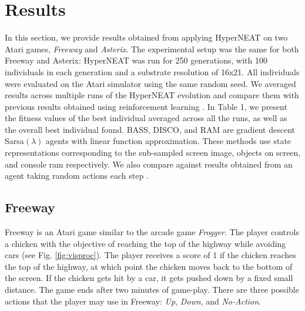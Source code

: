 \documentclass{acm_proc_article-sp}
\begin{document}
\section{Results}
\label{sec:results}
In this section, we provide results obtained from applying HyperNEAT on two Atari games, \textit{Freeway} and \textit{Asterix}. The experimental setup was the same for both Freeway and Asterix: HyperNEAT was run for 250 generations, with 100 individuals in each generation and a substrate resolution of 16x21. All individuals were evaluated on the Atari simulator using the same random seed. We averaged results across multiple runs of the HyperNEAT evolution and compare them with previous results obtained using reinforcement learning \cite{naddaf10}. In Table 1, we present the fitness values of the best individual averaged across all the runs, as well as the overall best individual found. BASS, DISCO, and RAM are gradient descent Sarsa$(\lambda)$ agents with linear function approximation. These methods use state representations corresponding to the sub-sampled screen image, objects on screen, and console ram respectively. We also compare against results obtained from an agent taking random actions each step \cite{naddaf10}. 

\subsection {Freeway}

Freeway is an Atari game similar to the arcade game \textit{Frogger}. The player controls a chicken with the objective of reaching the top of the highway while avoiding cars (see Fig. \ref{fig:visproc}). The player receives a score of 1 if the chicken reaches the top of the highway, at which point the chicken moves back to the bottom of the screen. If the chicken gets hit by a car, it gets pushed down by a fixed small distance. The game ends after two minutes of game-play. There are three possible actions that the player may use in Freeway: \textit{Up}, \textit{Down}, and \textit{No-Action}.
\end{document}
